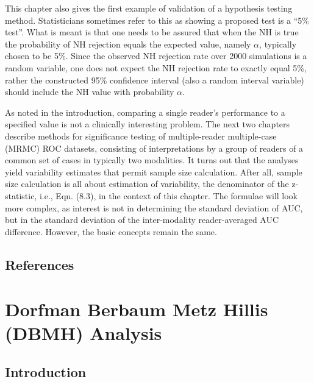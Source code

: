 \documentclass[
]{book}
\begin{document}
This chapter also gives the first example of validation of a hypothesis testing method. Statisticians sometimes refer to this as showing a proposed test is a ``5\% test''. What is meant is that one needs to be assured that when the NH is true the probability of NH rejection equals the expected value, namely \(\alpha\), typically chosen to be 5\%. Since the observed NH rejection rate over 2000 simulations is a random variable, one does not expect the NH rejection rate to exactly equal 5\%, rather the constructed 95\% confidence interval (also a random interval variable) should include the NH value with probability \(\alpha\).

As noted in the introduction, comparing a single reader's performance to a specified value is not a clinically interesting problem. The next two chapters describe methods for significance testing of multiple-reader multiple-case (MRMC) ROC datasets, consisting of interpretations by a group of readers of a common set of cases in typically two modalities. It turns out that the analyses yield variability estimates that permit sample size calculation. After all, sample size calculation is all about estimation of variability, the denominator of the z-statistic, i.e., Eqn. (8.3), in the context of this chapter. The formulae will look more complex, as interest is not in determining the standard deviation of AUC, but in the standard deviation of the inter-modality reader-averaged AUC difference. However, the basic concepts remain the same.

\hypertarget{references}{%
\section{References}\label{references}}

\hypertarget{DBMHnalysis}{%
\chapter{Dorfman Berbaum Metz Hillis (DBMH) Analysis}\label{DBMHnalysis}}

\hypertarget{introduction-1}{%
\section{Introduction}\label{introduction-1}}
\end{document}
